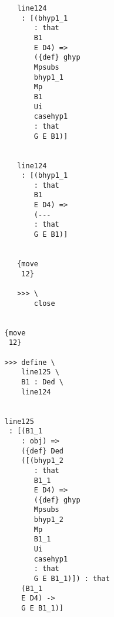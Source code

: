 \documentclass[12pt]{article}
\begin{document}
\begin{verbatim}
                                       line124 
                                        : [(bhyp1_1 
                                           : that 
                                           B1 
                                           E D4) => 
                                           ({def} ghyp 
                                           Mpsubs 
                                           bhyp1_1 
                                           Mp 
                                           B1 
                                           Ui 
                                           casehyp1 
                                           : that 
                                           G E B1)]


                                       line124 
                                        : [(bhyp1_1 
                                           : that 
                                           B1 
                                           E D4) => 
                                           (--- 
                                           : that 
                                           G E B1)]


                                       {move 
                                        12}

                                       >>> \
                                           close


                                    {move 
                                     12}

                                    >>> define \
                                        line125 \
                                        B1 : Ded \
                                        line124


                                    line125 
                                     : [(B1_1 
                                        : obj) => 
                                        ({def} Ded 
                                        ([(bhyp1_2 
                                           : that 
                                           B1_1 
                                           E D4) => 
                                           ({def} ghyp 
                                           Mpsubs 
                                           bhyp1_2 
                                           Mp 
                                           B1_1 
                                           Ui 
                                           casehyp1 
                                           : that 
                                           G E B1_1)]) : that 
                                        (B1_1 
                                        E D4) -> 
                                        G E B1_1)]



\end{verbatim}
\end{document}
